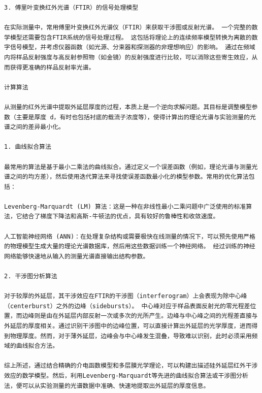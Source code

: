 \documentclass[a4paper]{ctexart}
\begin{document}
\begin{lstlisting}
3. 傅里叶变换红外光谱（FTIR）的信号处理模型

在实际测量中，常用傅里叶变换红外光谱仪（FTIR）来获取干涉图或反射光谱。 一个完整的数学模型还需要包含FTIR系统的信号处理过程。 这包括将理论上的连续频率模型转换为离散的数字信号模型，并考虑仪器函数（如光源、分束器和探测器的非理想响应）的影响。 通过在频域内将样品反射强度与高反射参照物（如金镜）的反射强度进行比较，可以消除这些寄生效应，从而获得更准确的样品反射率光谱。

计算算法

从测量的红外光谱中提取外延层厚度的过程，本质上是一个逆向求解问题。其目标是调整模型参数（主要是厚度 d，有时也包括衬底的载流子浓度等），使得计算出的理论光谱与实验测量的光谱之间的差异最小化。

1. 曲线拟合算法

最常用的算法是基于最小二乘法的曲线拟合。通过定义一个误差函数（例如，理论光谱与测量光谱之间的均方差），然后使用迭代算法来寻找使误差函数最小化的模型参数。常用的优化算法包括：

Levenberg-Marquardt (LM) 算法：这是一种在非线性最小二乘问题中广泛使用的标准算法，它结合了梯度下降法和高斯-牛顿法的优点，具有较好的鲁棒性和收敛速度。

人工智能神经网络 (ANN)：在处理复杂结构或需要极快在线测量的情况下，可以预先使用严格的物理模型生成大量的理论光谱数据库，然后用这些数据训练一个神经网络。 经过训练的神经网络能够快速地从输入的测量光谱直接输出结构参数。

2. 干涉图分析算法

对于较厚的外延层，其干涉效应在FTIR的干涉图（interferogram）上会表现为除中心峰（centerburst）之外的边峰（sidebursts）。 中心峰对应于样品表面反射光的零光程差位置，而边峰则是由在外延层内部反射一次或多次的光所产生。边峰与中心峰之间的光程差直接与外延层的厚度相关。通过识别干涉图中的边峰位置，可以直接计算出外延层的光学厚度，进而得到物理厚度。然而，对于薄外延层，边峰会与中心峰发生混叠，导致难以识别，此时必须采用频域的曲线拟合方法。

综上所述，通过结合精确的介电函数模型和多层膜光学理论，可以构建出描述硅外延层红外干涉效应的数学模型。然后，利用Levenberg-Marquardt等先进的曲线拟合算法或干涉图分析法，便可以从实验测量的光谱数据中准确、快速地提取出外延层的厚度信息。

\end{lstlisting}
\end{document}
